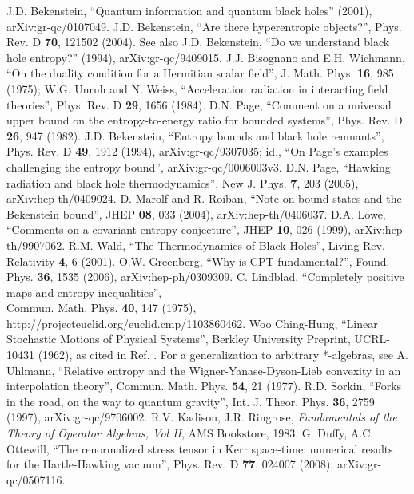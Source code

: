 \documentclass[12pt]{article}
\begin{document}
\begin{thebibliography}{99}
J.D. Bekenstein, ``Quantum information and quantum black holes'' (2001), arXiv:gr-qc/0107049.
J.D. Bekenstein, ``Are there hyperentropic objects?'', Phys. Rev. D \textbf{70}, 121502 (2004).  See also J.D. Bekenstein, ``Do we understand black hole entropy?'' (1994), arXiv:gr-qc/9409015.
J.J. Bisognano and E.H. Wichmann, ``On the duality condition for a Hermitian scalar field'', J. Math. Phys. \textbf{16}, 985 (1975); W.G. Unruh and N. Weiss, ``Acceleration radiation in interacting field theories'', Phys. Rev. D \textbf{29}, 1656 (1984).
D.N. Page, ``Comment on a universal upper bound on the entropy-to-energy ratio for bounded systems'', Phys. Rev. D \textbf{26}, 947 (1982).
J.D. Bekenstein, ``Entropy bounds and black hole remnants'', Phys. Rev. D \textbf{49}, 1912 (1994), arXiv:gr-qc/9307035; id., ``On Page's examples challenging the entropy bound'', arXiv:gr-qc/0006003v3.
D.N. Page, ``Hawking radiation and black hole thermodynamics'', New J. Phys. \textbf{7}, 203 (2005), arXiv:hep-th/0409024.
D. Marolf and R. Roiban, ``Note on bound states and the Bekenstein bound'', JHEP \textbf{08}, 033 (2004), arXiv:hep-th/0406037.
D.A. Lowe, ``Comments on a covariant entropy conjecture'', JHEP \textbf{10}, 026 (1999), arXiv:hep-th/9907062.
R.M. Wald, ``The Thermodynamics of Black Holes'', Living Rev. Relativity \textbf{4}, 6 (2001).
O.W. Greenberg, ``Why is CPT fundamental?'', Found. Phys. \textbf{36}, 1535 (2006), arXiv:hep-ph/0309309.
C. Lindblad, ``Completely positive maps and entropy inequalities'', \\Commun. Math. Phys. \textbf{40}, 147 (1975), \\http://projecteuclid.org/euclid.cmp/1103860462.  Woo Ching-Hung, ``Linear Stochastic Motions of Physical Systems'', Berkley University Preprint, UCRL-10431 (1962), as cited in Ref. \cite{sorkin98}.  For a generalization to arbitrary *-algebras, see A. Uhlmann, ``Relative entropy and the Wigner-Yanase-Dyson-Lieb convexity in an interpolation theory'', Commun. Math. Phys. \textbf{54}, 21 (1977).
R.D. Sorkin, ``Forks in the road, on the way to quantum gravity'', Int. J. Theor. Phys. \textbf{36}, 2759 (1997), arXiv:gr-qc/9706002.
R.V. Kadison, J.R. Ringrose, \textit{Fundamentals of the Theory of Operator Algebras, Vol II}, AMS Bookstore, 1983.
G. Duffy, A.C. Ottewill, ``The renormalized stress tensor in Kerr space-time: numerical results for the Hartle-Hawking vacuum'', Phys. Rev. D \textbf{77}, 024007 (2008), arXiv:gr-qc/0507116.

\end{thebibliography}
\end{document}
